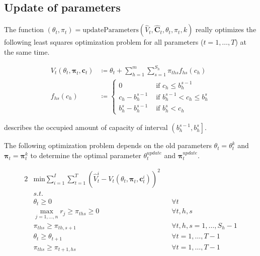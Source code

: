 \subsection{Update of parameters}\label{sec-updateParameter}
The function $\left(\theta_t, \pi_t \right) = \text{updateParameters}\left(\hat{V}_t, \mathbf{\hat{C}}_t, \theta_t, \pi_t, k\right)$ really optimizes the following least squares optimization problem for all parameters ($t = 1, \dots, T$) at the same time.

\begin{align}
V_t(\theta_t, \mathbf{\pi}_t, \mathbf{c}_t) & \coloneqq \theta_t + \sum_{h=1}^{m}\sum_{s=1}^{S_h} \pi_{ths} f_{hs}(c_h) \\
f_{hs}(c_h) &\coloneqq 
\begin{cases}\label{def-f}
0 & \text{ if } c_h \leq b_h^{s-1}\\
c_h - b_h^{s-1} & \text{ if } b_h^{s-1} < c_h \leq b_h^s \\
b_h^s - b_h^{s-1} & \text{ if } b_h^s < c_h
\end{cases}
\end{align}

 describes the occupied amount of capacity of interval $\left(b_h^{s-1}, b_h^s\right]$.

The following optimization problem depends on the old parameters $\theta_t = \theta_t^k$ and $\mathbf{\pi}_t = \mathbf{\pi}_t^k$ to determine the optimal parameter $\theta_t^{update}$ and $\mathbf{\pi}_t^{update}$.

\begin{alignat}{2}
& \text{min} \sum_{i=1}^{I}\sum_{t=1}^{T} \left( \hat{V}_t^i - V_t(\theta_t, \mathbf{\pi}_t, \mathbf{c}_t^i) \right)^2 && \\
& s.t. && \\
& \theta_t \geq 0 && \forall t\\
& \max_{j=1, \dots, n} r_j \geq \pi_{ths} \geq 0 && \forall t, h, s\\
& \pi_{ths} \geq \pi_{th,s+1} && \forall t, h, s = 1, \dots, S_h-1\\
& \theta_t \geq \theta_{t+1} && \forall t = 1, \dots, T-1\\
& \pi_{ths} \geq \pi_{t+1,hs} && \forall t = 1, \dots, T-1
\end{alignat}


